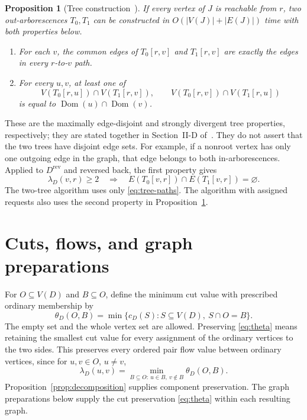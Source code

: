 \documentclass[11pt]{article}
\newtheorem{proposition}[theorem]{Proposition}
\theoremstyle{definition}
\theoremstyle{remark}
\newcommand{\rev}[1]{#1^{\mathrm{rev}}}
\newcommand{\Dom}{\operatorname{Dom}}
\begin{document}
\begin{proposition}[Tree construction~\cite{GT15}]
\label{prop:trees}
If every vertex of \(J\) is reachable from \(r\), two out-arborescences \(T_0,T_1\) can be constructed in \(O(|V(J)|+|E(J)|)\) time with both properties below.
\begin{enumerate}
\item For each \(v\), the common edges of \(T_0[r,v]\) and \(T_1[r,v]\) are exactly the edges in every \(r\)-to-\(v\) path.
\item For every \(u,v\), at least one of
\[
 V(T_0[r,u])\cap V(T_1[r,v]),\qquad
 V(T_0[r,v])\cap V(T_1[r,u])
\]
is equal to \(\Dom(u)\cap\Dom(v)\).
\end{enumerate}
\end{proposition}
These are the maximally edge-disjoint and strongly divergent tree properties, respectively; they are stated together in Section~II-D of~\cite{GIK24}. They do not assert that the two trees have disjoint edge sets. For example, if a nonroot vertex has only one outgoing edge in the graph, that edge belongs to both in-arborescences. Applied to \(\rev D\) and reversed back, the first property gives
\begin{equation}
 \lambda_D(v,r)\ge2
 \quad\Longrightarrow\quad
 E(T_0[v,r])\cap E(T_1[v,r])=\varnothing.
 \label{eq:tree-paths}
\end{equation}
The two-tree algorithm uses only \eqref{eq:tree-paths}. The algorithm with assigned requests also uses the second property in Proposition~\ref{prop:trees}.

\section{Cuts, flows, and graph preparations}
\label{sec:preparations}

For \(O\subseteq V(D)\) and \(B\subseteq O\), define the minimum cut value with prescribed ordinary membership by
\begin{equation}
 \theta_D(O,B)=\min\{c_D(S):S\subseteq V(D),\ S\cap O=B\}.
 \label{eq:theta}
\end{equation}
The empty set and the whole vertex set are allowed. Preserving \eqref{eq:theta} means retaining the smallest cut value for every assignment of the ordinary vertices to the two sides. This preserves every ordered pair flow value between ordinary vertices, since for \(u,v\in O\), \(u\ne v\),
\[
 \lambda_D(u,v)=\min_{B\subseteq O:\ u\in B,\ v\notin B}\theta_D(O,B).
\]
Proposition~\ref{prop:decomposition} supplies component preservation. The graph preparations below supply the cut preservation \eqref{eq:theta} within each resulting graph.
\end{document}
